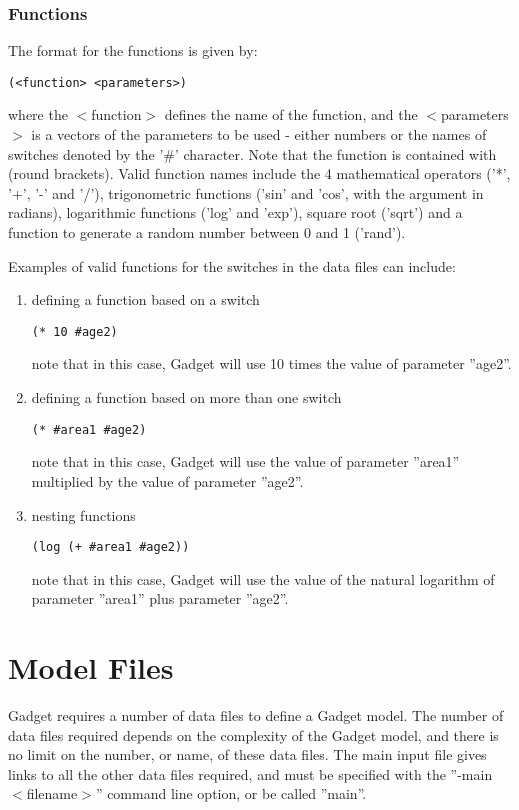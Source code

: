 \documentclass[10pt,twoside]{book}
\begin{document}
\subsection{Functions}
The format for the functions is given by:

{\small\begin{verbatim}
(<function> <parameters>)
\end{verbatim}}

where the $<$function$>$ defines the name of the function, and the $<$parameters$>$ is a vectors of the parameters to be used - either numbers or the names of switches denoted by the '\#' character.  Note that the function is contained with (round brackets).  Valid function names include the 4 mathematical operators ('*', '+', '-' and '/'), trigonometric functions ('sin' and 'cos', with the argument in radians), logarithmic functions ('log' and 'exp'), square root ('sqrt') and a function to generate a random number between 0 and 1 ('rand').

\bigskip
Examples of valid functions for the switches in the data files can include:

\begin{enumerate}
\item defining a function based on a switch
{\small\begin{verbatim}
(* 10 #age2)
\end{verbatim}}
note that in this case, Gadget will use 10 times the value of parameter ''age2''.
\item defining a function based on more than one switch
{\small\begin{verbatim}
(* #area1 #age2)
\end{verbatim}}
note that in this case, Gadget will use the value of parameter ''area1'' multiplied by the value of parameter ''age2''.
\item nesting functions
{\small\begin{verbatim}
(log (+ #area1 #age2))
\end{verbatim}}
note that in this case, Gadget will use the value of the natural logarithm of parameter ''area1'' plus parameter ''age2''.
\end{enumerate}

\chapter{Model Files}\label{chap:model}
Gadget requires a number of data files to define a Gadget model.  The number of data files required depends on the complexity of the Gadget model, and there is no limit on the number, or name, of these data files.  The main input file gives links to all the other data files required, and must be specified with the ''-main $<$filename$>$'' command line option, or be called ''main''.
\end{document}
